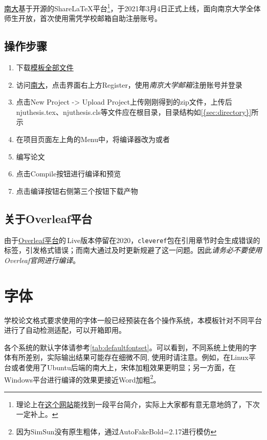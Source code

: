 \href{https://tex.nju.edu.cn}{南大}基于开源的ShareLaTeX平台\footnote{理论上在\href{https://doc.nju.edu.cn/books/latex}{这个网站}能找到一段平台简介，实际上大家都有意无意地鸽了，下次一定补上。}，于2021年3月4日正式上线，面向南京大学全体师生开放，首次使用需凭学校邮箱自助注册账号。

\subsection{操作步骤}

\begin{enumerate}
    \item 下载\href{https://github.com/nju-lug/NJUThesisUndergraduate/archive/refs/heads/master.zip}{模板全部文件}
    \item 访问\href{https://tex.nju.edu.cn}{南大}，点击界面右上方Register，使用\emph{南京大学邮箱}注册账号并登录
    \item 点击New Project -> Upload Project上传刚刚得到的zip文件，上传后njuthesis.tex、njuthesis.cls等文件应在根目录，目录结构如\cref{{sec:directory}}所示
    \item 在项目页面左上角的Menu中，将编译器改为或者
    \item 编写论文
    \item 点击Compile按钮进行编译和预览
    \item 点击编译按钮右侧第三个按钮下载产物
\end{enumerate}

\subsection{关于Overleaf平台}

由于\href{https://www.overleaf.com/}{Overleaf平台}的\,Live版本停留在2020，\texttt{cleveref}包在引用章节时会生成错误的标签，引发格式错误；而南大通过及时更新规避了这一问题。因此\emph{请务必不要使用Overleaf官网进行编译}。

\section{字体}

学校论文格式要求使用的字体一般已经预装在各个操作系统，本模板针对不同平台进行了自动检测适配，可以开箱即用。

各个系统的默认字体请参考\cref{tab:defaultfontset}。可以看到，不同系统上使用的字体有所差别，实际输出结果可能存在细微不同, 使用时请注意。例如，在Linux平台或者使用了Ubuntu后端的南大上，宋体加粗效果更明显；另一方面，在Windows平台进行编译的效果更接近Word加粗\footnote{因为SimSun没有原生粗体，通过AutoFakeBold=2.17进行模仿}。

